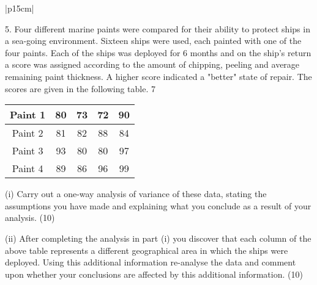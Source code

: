 \documentclass[a4paper,12pt]{article}
\begin{document}
\begin{table}[ht!]
     

\centering
     

\begin{tabular}{|p{15cm}|}
     

\hline 


5. Four different marine paints were compared for their ability to protect ships in a sea-going environment.  Sixteen ships were used, each painted with one of the four paints.  Each of the ships was deployed for 6 months and on the ship's return a score was assigned according to the amount of chipping, peeling and average remaining paint thickness.  A higher score indicated a "better" state of repair.  The scores are given in the following table. 
 7

\begin{center}
\begin{tabular}{|c||c|c|c|c|}
Paint 1 & 80 & 73 & 72&  90 \\ \hline 
Paint 2 & 81 & 82 & 88&  84  \\ \hline
Paint 3 & 93 & 80 & 80&  97 \\ \hline
Paint 4 & 89 & 86 & 96&  99 \\ \hline
\end{tabular}
\end{center}
 
(i) Carry out a one-way analysis of variance of these data, stating the assumptions you have made and explaining what you conclude as a result of your analysis. (10) 
 
(ii) After completing the analysis in part (i) you discover that each column of the above table represents a different geographical area in which the ships were deployed.  Using this additional information re-analyse the data and comment upon whether your conclusions are affected by this additional information. (10) 
 
\\ \hline


\end{tabular}
    

\end{table}

\end{document}
